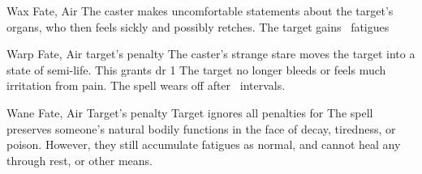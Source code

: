   {}%
  {Wax}%
  {Fate, Air}%
  {}%
  {The caster makes uncomfortable statements about the target's organs, who then feels sickly and possibly retches.
  The target gains ~\glspl{fatigue}}%
  {}

  {}%
  {Warp}%
  {Fate, Air}%
  {target's  penalty}%
  {The caster's strange stare moves the target into a state of semi-life.
  This grants \gls{dr} 1}%
  {
    The target no longer bleeds or feels much irritation from pain.%
    The spell wears off after ~\glspl{interval}.}

  {}%
  {Wane}%
  {Fate, Air}%
  {Target's  penalty}%
  {Target ignores all  penalties for }%
  {The spell preserves someone's natural bodily functions in the face of decay, tiredness, or poison.
    However, they still accumulate \glspl{fatigue} as normal, and cannot heal any through rest, or other means.}


